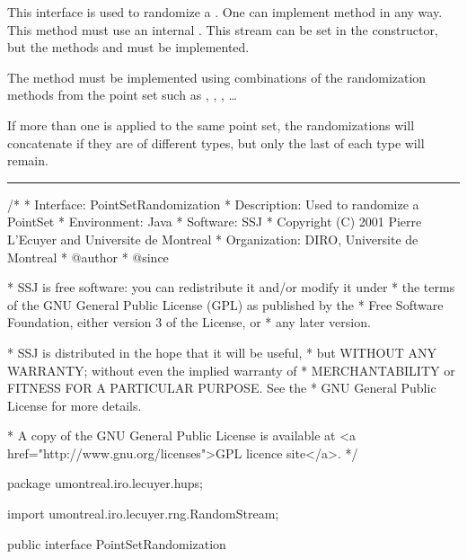 
This interface is used to randomize a
. One can
implement method  in any way. This
method must use an internal
. This
stream can be set in the constructor, but the methods
 and  must be
implemented.

The method  must be implemented using
combinations of the randomization methods from the point set such
as
,
,
,
\hspace{1pt}\ldots

If more than one  is applied to the
same point set, the randomizations will concatenate if they are of
different types, but only the last of each type will remain.

\bigskip\hrule\bigskip

\begin{code}
\begin{hide}
/*
 * Interface:    PointSetRandomization
 * Description:  Used to randomize a PointSet
 * Environment:  Java
 * Software:     SSJ 
 * Copyright (C) 2001  Pierre L'Ecuyer and Universite de Montreal
 * Organization: DIRO, Universite de Montreal
 * @author       
 * @since

 * SSJ is free software: you can redistribute it and/or modify it under
 * the terms of the GNU General Public License (GPL) as published by the
 * Free Software Foundation, either version 3 of the License, or
 * any later version.

 * SSJ is distributed in the hope that it will be useful,
 * but WITHOUT ANY WARRANTY; without even the implied warranty of
 * MERCHANTABILITY or FITNESS FOR A PARTICULAR PURPOSE.  See the
 * GNU General Public License for more details.

 * A copy of the GNU General Public License is available at
   <a href="http://www.gnu.org/licenses">GPL licence site</a>.
 */
\end{hide}
package umontreal.iro.lecuyer.hups;
\begin{hide}
import umontreal.iro.lecuyer.rng.RandomStream;

\end{hide}
public interface PointSetRandomization \begin{hide} {
\end{hide}
\end{code}

